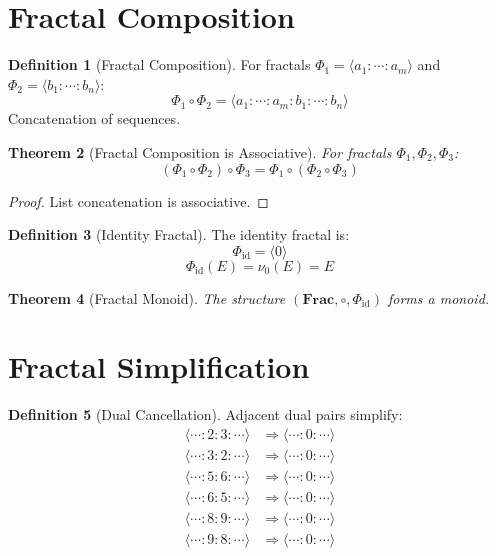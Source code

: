 \documentclass[11pt,twoside,openright]{book}
\theoremstyle{definition}
\newtheorem{definition}{Definition}[chapter]
\theoremstyle{plain}
\newtheorem{theorem}[definition]{Theorem}
\theoremstyle{remark}
\newcommand{\noe}[1]{\nu_{#1}}
\newcommand{\Frac}{\Phi}
\newcommand{\FracSet}{\mathbf{Frac}}
\newcommand{\id}{\mathrm{id}}
\begin{document}
\section{Fractal Composition}

\begin{definition}[Fractal Composition]
\label{def:fractal-comp}
For fractals $\Frac_1 = \langle a_1 : \cdots : a_m \rangle$ and $\Frac_2 = \langle b_1 : \cdots : b_n \rangle$:
\[
\Frac_1 \circ \Frac_2 = \langle a_1 : \cdots : a_m : b_1 : \cdots : b_n \rangle
\]
Concatenation of sequences.
\end{definition}

\begin{theorem}[Fractal Composition is Associative]
\label{thm:fractal-assoc}
For fractals $\Frac_1, \Frac_2, \Frac_3$:
\[
(\Frac_1 \circ \Frac_2) \circ \Frac_3 = \Frac_1 \circ (\Frac_2 \circ \Frac_3)
\]
\end{theorem}

\begin{proof}
List concatenation is associative.
\end{proof}

\begin{definition}[Identity Fractal]
\label{def:id-fractal}
The identity fractal is:
\[
\Frac_{\id} = \langle 0 \rangle
\]
\[
\Frac_{\id}(E) = \noe{0}(E) = E
\]
\end{definition}

\begin{theorem}[Fractal Monoid]
\label{thm:fractal-monoid}
The structure $(\FracSet, \circ, \Frac_{\id})$ forms a monoid.
\end{theorem}

\section{Fractal Simplification}

\begin{definition}[Dual Cancellation]
\label{def:dual-cancel}
Adjacent dual pairs simplify:
\begin{align}
\langle \cdots : 2 : 3 : \cdots \rangle &\Rightarrow \langle \cdots : 0 : \cdots \rangle \\
\langle \cdots : 3 : 2 : \cdots \rangle &\Rightarrow \langle \cdots : 0 : \cdots \rangle \\
\langle \cdots : 5 : 6 : \cdots \rangle &\Rightarrow \langle \cdots : 0 : \cdots \rangle \\
\langle \cdots : 6 : 5 : \cdots \rangle &\Rightarrow \langle \cdots : 0 : \cdots \rangle \\
\langle \cdots : 8 : 9 : \cdots \rangle &\Rightarrow \langle \cdots : 0 : \cdots \rangle \\
\langle \cdots : 9 : 8 : \cdots \rangle &\Rightarrow \langle \cdots : 0 : \cdots \rangle
\end{align}
\end{definition}
\end{document}
